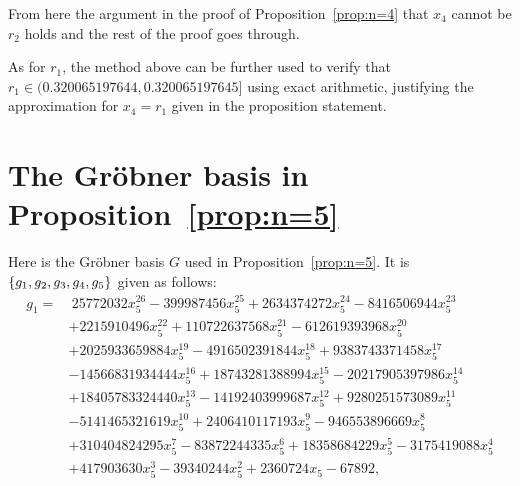 \documentclass[preprint,12pt,authoryear]{elsarticle}
\DeclarePairedDelimiter{\ios}{\{}{\}}
\newcommand{\s}{\ios*}
\begin{document}
From here the argument in the proof of Proposition~\ref{prop:n=4} that $x_4$ cannot be $r_2$ holds and the rest of the proof goes through.

As for $r_1$, the method above can be further used to verify that $r_1\in(0.320065197644,0.320065197645]$ using exact arithmetic, justifying the approximation for $x_4=r_1$ given in the proposition statement.


\section{The Gr\"obner basis in Proposition~\ref{prop:n=5}}\label{app:grobner-basis}

Here is the Gr\"obner basis $G$ used in Proposition~\ref{prop:n=5}. It is 
$\s{g_1,g_2,g_3,g_4,g_5}$ given as follows:
\begin{align*}
  g_1=&~25772032x_5^{26}-399987456x_5^{25}+2634374272x_5^{24}-8416506944x_5^{23}\\
  &+2215910496x_5^{22}+110722637568x_5^{21}-612619393968x_5^{20}\\
  &+2025933659884x_5^{19}-4916502391844x_5^{18}+9383743371458x_5^{17}\\
  &-14566831934444x_5^{16}+18743281388994x_5^{15}-20217905397986x_5^{14}\\
  &+18405783324440x_5^{13}-14192403999687x_5^{12}+9280251573089x_5^{11}\\
  &-5141465321619x_5^{10}+2406410117193x_5^9-946553896669x_5^8\\
  &+310404824295x_5^7-83872244335x_5^6+18358684229x_5^5-3175419088x_5^4\\
  &+417903630x_5^3-39340244x_5^2+2360724x_5-67892,
\end{align*}
\end{document}
